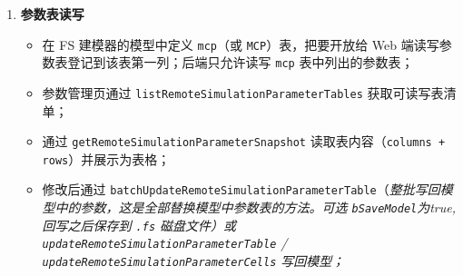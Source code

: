 \begin{enumerate}[label=\arabic*)]
\begin{itemize}
		\item 前端：用 \texttt{mqtt.js} 通过 WebSocket 连接 MQTT Broker（\texttt{ws://127.0.0.1:8083/mqtt}）；
		\item 订阅 \texttt{factory/sim/\{userId\}/\{modelId\}/+} 与 \texttt{.../animation/\#} 主题：JSON 消息按尾段类型分发，动画帧的二进制 payload 转为 \texttt{Blob('image/jpeg')} 显示在页面上，\texttt{animation/\{layerId\}/objects} 结构化对象帧存入 store 供实时事件分析。
	\end{itemize}
    \vspace{10pt} \bf{可订阅的 MQTT 主题如下，可参照 Demo 程序选择需要的，不一定全部订阅：}
    {\scriptsize
    \begin{verbatim}
    factory/sim/{username}/{modelId}/status                         模型状态
    factory/sim/{username}/{modelId}/progress                       仿真进度
    factory/sim/{username}/{modelId}/console                        FS控制台信息
    factory/sim/{username}/{modelId}/events                         MU事件：可用于实时驱动数字孪生，或保存到csv/nosql数据库做分析、回放
    factory/sim/{username}/{modelId}/animation/layers               层级目录（对象组, root为主模型）
    factory/sim/{username}/{modelId}/animation/state                推帧状态
    factory/sim/{username}/{modelId}/animation/frameMeta            帧元数据
    factory/sim/{username}/{modelId}/animation/{layerId}/frame      JPEG图片（二进制 payload）
    factory/sim/{username}/{modelId}/animation/{layerId}/objects    结构化对象帧（JSON 格式 payload, 用于位置对齐式的外部数字孪生渲染）
    \end{verbatim}
    }
	\item \bf{参数表读写}\label{sec:brief-step8}
	\begin{itemize}
		\item 在 FS 建模器的模型中定义 \texttt{mcp}（或 \texttt{MCP}）表，把要开放给 Web 端读写参数表登记到该表第一列；后端只允许读写 \texttt{mcp} 表中列出的参数表；\\
		\item 参数管理页通过 \texttt{listRemoteSimulationParameterTables} 获取可读写表清单；
		\item 通过 \texttt{getRemoteSimulationParameterSnapshot} 读取表内容（\texttt{columns + rows}）并展示为表格；
		\item 修改后通过 \texttt{batchUpdateRemoteSimulationParameterTable}（\it{整批写回模型中的参数，这是全部替换模型中参数表的方法。可选 \texttt{bSaveModel}为true, 回写之后保存到 \texttt{.fs} 磁盘文件}）或 \texttt{updateRemoteSimulationParameterTable} / \texttt{updateRemoteSimulationParameterCells} 写回模型；

\end{itemize}
\end{enumerate}
